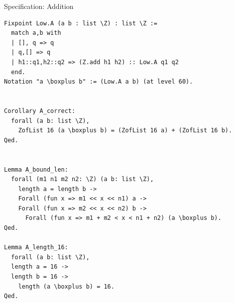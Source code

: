 \documentclass[8pt,aspectratio=169]{beamer}
\begin{document}
%
%
\begin{frame}[fragile]{Specification: Addition}
	\begin{center}
		\begin{lstlisting}[language=Coq]
Fixpoint Low.A (a b : list \Z) : list \Z :=
  match a,b with
  | [], q => q
  | q,[] => q
  | h1::q1,h2::q2 => (Z.add h1 h2) :: Low.A q1 q2
  end.
Notation "a \boxplus b" := (Low.A a b) (at level 60).


Corollary A_correct:
  forall (a b: list \Z),
    ZofList 16 (a \boxplus b) = (ZofList 16 a) + (ZofList 16 b).
Qed.


Lemma A_bound_len:
  forall (m1 n1 m2 n2: \Z) (a b: list \Z),
    length a = length b ->
    Forall (fun x => m1 << x << n1) a ->
    Forall (fun x => m2 << x << n2) b ->
      Forall (fun x => m1 + m2 < x < n1 + n2) (a \boxplus b).
Qed.

Lemma A_length_16:
  forall (a b: list \Z),
  length a = 16 ->
  length b = 16 ->
    length (a \boxplus b) = 16.
Qed.
\end{lstlisting}

	\end{center}
\end{frame}
\end{document}
